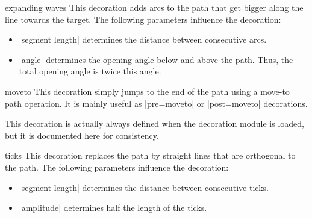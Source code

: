 \begin{decoration}{expanding waves}
    This decoration adds arcs to the path that get bigger along the line
    towards the target. The following parameters influence the decoration:
    \begin{itemize}
        \item |segment length| determines the distance between consecutive
            arcs.
        \item |angle| determines the opening angle below and above the path.
            Thus, the total opening angle is twice this angle.
    \end{itemize}
\begin{codeexample}[preamble={\usetikzlibrary{decorations.pathreplacing}}]
\end{codeexample}
\end{decoration}

\begin{decoration}{moveto}
    This decoration simply jumps to the end of the path using a move-to path
    operation. It is mainly useful as |pre=moveto| or |post=moveto|
    decorations.

    This decoration is actually always defined when the decoration module is
    loaded, but it is documented here for consistency.
\end{decoration}

\begin{decoration}{ticks}
    This decoration replaces the path by straight lines that are orthogonal to
    the path. The following parameters influence the decoration:
    \begin{itemize}
        \item |segment length| determines the distance between consecutive
            ticks.
        \item |amplitude| determines half the length of the ticks.
    \end{itemize}
\begin{codeexample}[preamble={\usetikzlibrary{decorations.pathreplacing}}]
\end{codeexample}
\end{decoration}

